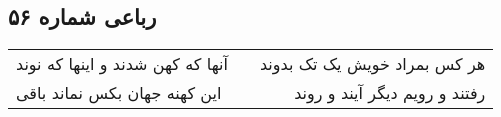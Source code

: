 \begin{center}
\section*{رباعی شماره ۵۶}
\label{sec:sh056}
\begin{longtable}{l p{0.5cm} r}
آنها که کهن شدند و اینها که نوند
&&
هر کس بمراد خویش یک تک بدوند
\\
این کهنه جهان بکس نماند باقی
&&
رفتند و رویم دیگر آیند و روند
\\
\end{longtable}
\end{center}
